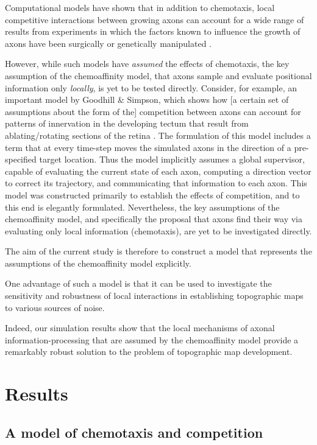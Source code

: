 \documentclass[11pt, a4paper]{article}
\begin{document}
Computational models have shown that in addition to chemotaxis, local competitive interactions between growing axons can account for a wide range of results from experiments in which the factors known to influence the growth of axons have been surgically or genetically manipulated \citep{prestige_role_1975,simpson_simple_2011,suetterlin_target-independent_2014}.

However, while such models have \emph{assumed} the effects of chemotaxis, the key assumption of the chemoaffinity model, that axons sample and evaluate positional information only \emph{locally}, is yet to be tested directly.
%
Consider, for example, an important model by Goodhill \& Simpson, which shows how [a certain set of assumptions about the form of the] competition between axons can account for patterns of innervation in the developing tectum that result from ablating/rotating sections of the retina \citep{simpson_simple_2011}.
%
The formulation of this model includes a term that at every time-step moves the simulated axons in the direction of a pre-specified target location.
Thus the model implicitly assumes a global supervisor, capable of evaluating the current state of each axon, computing a direction vector to correct its trajectory, and communicating that information to each axon.
%
This model was constructed primarily to establish the effects of competition, and to this end is elegantly formulated.
%
Nevertheless, the key assumptions of the chemoaffinity model, and specifically the proposal that axons find their way via evaluating only local information (chemotaxis), are yet to be investigated directly.

The aim of the current study is therefore to construct a model that represents the assumptions of the chemoaffinity model explicitly.

One advantage of such a model is that it can be used to investigate the sensitivity and robustness of local interactions in establishing topographic maps to various sources of noise.

Indeed, our simulation results show that the local mechanisms of axonal information-processing that are assumed by the chemoaffinity model provide a remarkably robust solution to the problem of topographic map development.

\section{Results}
\subsection*{A model of chemotaxis and competition}
\end{document}
